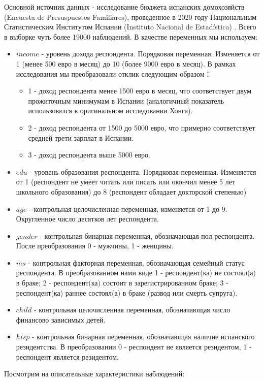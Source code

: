 \documentclass[a4paper]{article}
\begin{document}
Основной источник данных - исследование бюджета испанских домохозяйств (Encuesta de Presuspuestos Familiares), проведенное в 2020 году Национальным Статистическим Институтом Испании (Instituto Nacional de Estadística) \cite[INE, 2020]{INE}. Всего в выборке чуть более 19000 наблюдений. В качестве переменных мы используем:
\begin{itemize}
	\item $income$ - уровень дохода респондента. Порядковая переменная. Изменяется от 1 (менее 500 евро в месяц) до 10 (более 9000 евро в месяц). В рамках исследования мы преобразовали отклик следующим образом：
	\begin{itemize}
		\item[] 1 - доход респондента менее 1500 евро в месяц, что соответствует двум прожиточным минимумам в Испании (аналогичный показатель использовался в оригинальном исследовании Хонга).
		\item[] 2 - доход респондента от 1500 до 5000 евро, что примерно соответствует средней трети зарплат в Испании. 
		\item[] 3 - доход респондента выше 5000 евро.
	\end{itemize}
	\item $edu$ - уровень образования респондента. Порядковая переменная. Изменяется от 1 (респондент не умеет читать или писать или окончил менее 5 лет школьного образования) до 8 (респондент обладает докторской степенью)
	\item $age$ - контрольная целочисленная переменная, изменяется от 1 до 9. Округленное число десятков лет респондента.  
	\item $gender$ - контрольная бинарная переменная, обозначающая пол респондента. После преобразования 0 - мужчины, 1 - женщины. 
	\item $ms$ - контрольная факторная переменная, обозначающая семейный статус респондента. В преобразованном нами виде 1 - респондент(ка) не состоял(а) в браке; 2 - респондент(ка) состоит в зарегистрированном браке; 3 - респондент(ка) раннее состоял(а) в браке (развод или смерть супруга). 
	\item $child$ - контрольная целочисленная переменная, обозначающая число финансово зависимых детей. 
	\item $hisp$ - контрольная бинарная переменная, обозначающая наличие испанского резидентства. В преобразовании 0 - респондент не является резидентом, 1 - респондент является резидентом. 
\end{itemize}	
Посмотрим на описательные характеристики наблюдений:
\end{document}
